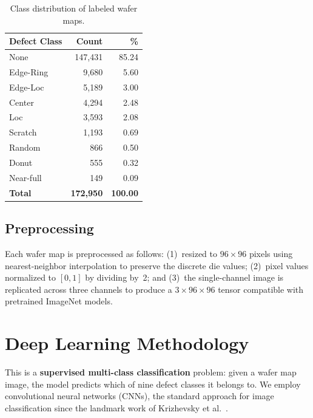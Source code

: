 \documentclass[conference]{IEEEtran}
\begin{document}
\begin{table}[H]
\centering
\caption{Class distribution of labeled wafer maps.}
\label{tab:class_distribution}
\begin{tabular}{@{}lrr@{}}
\toprule
\textbf{Defect Class} & \textbf{Count} & \textbf{\%} \\
\midrule
None        & 147{,}431 & 85.24 \\
Edge-Ring   &   9{,}680 &  5.60 \\
Edge-Loc    &   5{,}189 &  3.00 \\
Center      &   4{,}294 &  2.48 \\
Loc         &   3{,}593 &  2.08 \\
Scratch     &   1{,}193 &  0.69 \\
Random      &     866   &  0.50 \\
Donut       &     555   &  0.32 \\
Near-full   &     149   &  0.09 \\
\midrule
\textbf{Total} & \textbf{172{,}950} & \textbf{100.00} \\
\bottomrule
\end{tabular}
\end{table}

\subsection{Preprocessing}

Each wafer map is preprocessed as follows: (1)~resized to $96 \times 96$
pixels using nearest-neighbor interpolation to preserve the discrete die
values; (2)~pixel values normalized to $[0, 1]$ by dividing by~2; and
(3)~the single-channel image is replicated across three channels to produce a
$3 \times 96 \times 96$ tensor compatible with pretrained ImageNet models.

\section{Deep Learning Methodology}
\label{sec:methodology}

This is a \textbf{supervised multi-class classification} problem: given a
wafer map image, the model predicts which of nine defect classes it belongs
to. We employ convolutional neural networks (CNNs), the standard approach for
image classification since the landmark work of Krizhevsky et
al.~\cite{krizhevsky2012}.
\end{document}
